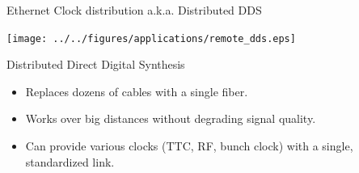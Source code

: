 \documentclass[compress,red]{beamer}
\begin{document}
\begin{frame}{Ethernet Clock distribution a.k.a. Distributed DDS}
  \begin{center}
    \texttt{[image: ../../figures/applications/remote\_dds.eps]}
  \end{center}
  \begin{block}{Distributed Direct Digital Synthesis}
    \begin{itemize}
    \item Replaces dozens of cables with a single fiber.
    \item Works over big distances without degrading signal quality.
    \item Can provide various clocks (TTC, RF, bunch clock) with a single, standardized link.
    \end{itemize}
  \end{block}
\end{frame}
\end{document}
